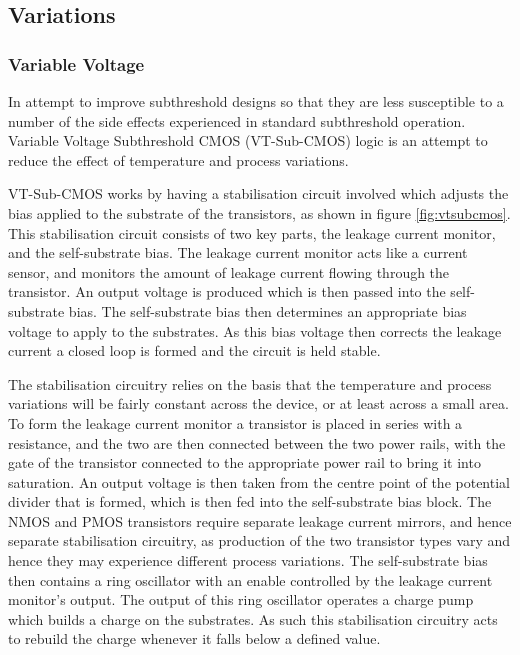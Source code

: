 \subsection{Variations}
\subsubsection{Variable Voltage}
In \cite{IEEEVLSIRobustSTL} \citeauthor{IEEEVLSIRobustSTL} attempt to improve subthreshold designs so that they are less susceptible to a number of the side effects experienced in standard subthreshold operation.
Variable Voltage Subthreshold CMOS (VT-Sub-CMOS) logic is an attempt to reduce the effect of temperature and process variations.

VT-Sub-CMOS works by having a stabilisation circuit involved which adjusts the bias applied to the substrate of the transistors, as shown in figure \ref{fig:vtsubcmos}.
This stabilisation circuit consists of two key parts, the leakage current monitor, and the self-substrate bias.
The leakage current monitor acts like a current sensor, and monitors the amount of leakage current flowing through the transistor.
An output voltage is produced which is then passed into the self-substrate bias.
The self-substrate bias then determines an appropriate bias voltage to apply to the substrates.
As this bias voltage then corrects the leakage current a closed loop is formed and the circuit is held stable.

The stabilisation circuitry relies on the basis that the temperature and process variations will be fairly constant across the device, or at least across a small area.
To form the leakage current monitor a transistor is placed in series with a resistance, and the two are then connected between the two power rails, with the gate of the transistor connected to the appropriate power rail to bring it into saturation.
An output voltage is then taken from the centre point of the potential divider that is formed, which is then fed into the self-substrate bias block.
The NMOS and PMOS transistors require separate leakage current mirrors, and hence separate stabilisation circuitry, as production of the two transistor types vary and hence they may experience different process variations.
The self-substrate bias then contains a ring oscillator with an enable controlled by the leakage current monitor's output.
The output of this ring oscillator operates a charge pump which builds a charge on the substrates.
As such this stabilisation circuitry acts to rebuild the charge whenever it falls below a defined value.

